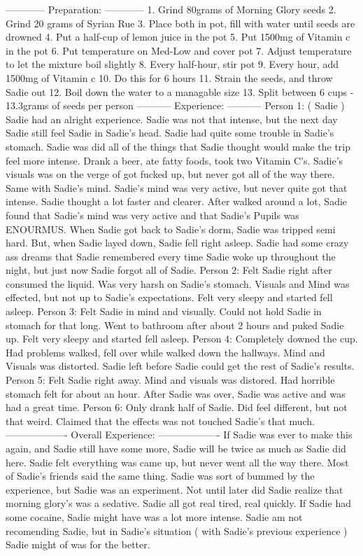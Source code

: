 \documentclass[12pt]{book}
\begin{document}
------------ Preparation: ------------ 1. Grind 80grams of Morning Glory seeds 2. Grind 20 grams of Syrian Rue 3. Place both in pot, fill with water until seeds are drowned 4. Put a half-cup of lemon juice in the pot 5. Put 1500mg of Vitamin c in the pot 6. Put temperature on Med-Low and cover pot 7. Adjust temperature to let the mixture boil slightly 8. Every half-hour, stir pot 9. Every hour, add 1500mg of Vitamin c 10. Do this for 6 hours 11. Strain the seeds, and throw Sadie out 12. Boil down the water to a managable size 13. Split between 6 cups - 13.3grams of seeds per person ----------- Experience: ----------- Person 1: ( Sadie ) Sadie had an alright experience. Sadie was not that intense, but the next day Sadie still feel Sadie in Sadie's head. Sadie had quite some trouble in Sadie's stomach. Sadie was did all of the things that Sadie thought would make the trip feel more intense. Drank a beer, ate fatty foods, took two Vitamin C's. Sadie's visuals was on the verge of got fucked up, but never got all of the way there. Same with Sadie's mind. Sadie's mind was very active, but never quite got that intense. Sadie thought a lot faster and clearer. After walked around a lot, Sadie found that Sadie's mind was very active and that Sadie's Pupils was ENOURMUS. When Sadie got back to Sadie's dorm, Sadie was tripped semi hard. But, when Sadie layed down, Sadie fell right asleep. Sadie had some crazy ass dreams that Sadie remembered every time Sadie woke up throughout the night, but just now Sadie forgot all of Sadie. Person 2: Felt Sadie right after consumed the liquid. Was very harsh on Sadie's stomach. Visuals and Mind was effected, but not up to Sadie's expectations. Felt very sleepy and started fell asleep. Person 3: Felt Sadie in mind and visually. Could not hold Sadie in stomach for that long. Went to bathroom after about 2 hours and puked Sadie up. Felt very sleepy and started fell asleep. Person 4: Completely downed the cup. Had problems walked, fell over while walked down the hallways. Mind and Visuals was distorted. Sadie left before Sadie could get the rest of Sadie's results. Person 5: Felt Sadie right away. Mind and visuals was distored. Had horrible stomach felt for about an hour. After Sadie was over, Sadie was active and was had a great time. Person 6: Only drank half of Sadie. Did feel different, but not that weird. Claimed that the effects was not touched Sadie's that much. ------------------- Overall Experience: ------------------- If Sadie was ever to make this again, and Sadie still have some more, Sadie will be twice as much as Sadie did here. Sadie felt everything was came up, but never went all the way there. Most of Sadie's friends said the same thing. Sadie was sort of bummed by the experience, but Sadie was an experiment. Not until later did Sadie realize that morning glory's was a sedative. Sadie all got real tired, real quickly. If Sadie had some cocaine, Sadie might have was a lot more intense. Sadie am not recomending Sadie, but in Sadie's situation ( with Sadie's previous experience ) Sadie might of was for the better.
\end{document}
